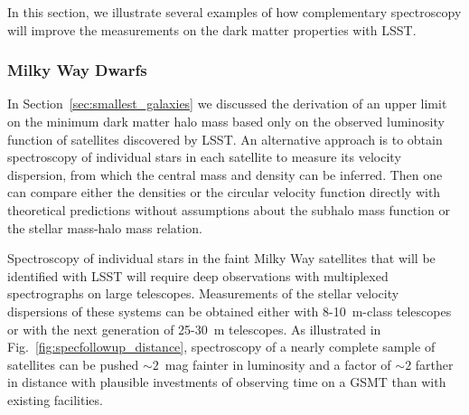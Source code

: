 In this section, we illustrate several examples of how complementary spectroscopy will improve the measurements on the dark matter properties with LSST.

\subsubsection{Milky Way Dwarfs }
In Section~\ref{sec:smallest_galaxies} we discussed the derivation of an upper limit on the minimum dark matter halo mass based only on the observed luminosity function of satellites discovered by LSST.  An alternative approach is to obtain spectroscopy of individual stars in each satellite to measure its velocity dispersion, from which the central mass and density can be inferred.  Then one can compare either the densities or the circular velocity function directly with theoretical predictions without assumptions about the subhalo mass function or the stellar mass-halo mass relation.

Spectroscopy of individual stars in the faint Milky Way satellites that will be identified with LSST will require deep observations with multiplexed spectrographs on large telescopes.  Measurements of the stellar velocity dispersions of these systems can be obtained either with 8-10~m-class telescopes or with the next generation of 25-30~m telescopes.  As illustrated in Fig.~\ref{fig:specfollowup_distance}, spectroscopy of a nearly complete sample of satellites can be pushed $\sim2$~mag fainter in luminosity and a factor of $\sim2$ farther in distance with plausible investments of observing time on a GSMT than with existing facilities.

